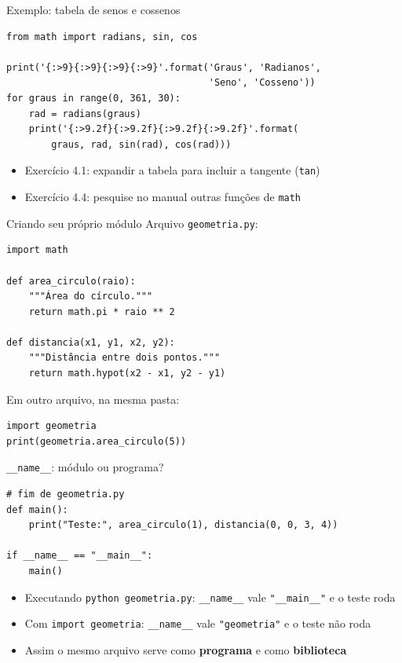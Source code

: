 \documentclass[aspectratio=169,10pt,t]{beamer}
\begin{document}
\begin{frame}[fragile]{Exemplo: tabela de senos e cossenos}
\begin{lstlisting}
from math import radians, sin, cos

print('{:>9}{:>9}{:>9}{:>9}'.format('Graus', 'Radianos',
                                    'Seno', 'Cosseno'))
for graus in range(0, 361, 30):
    rad = radians(graus)
    print('{:>9.2f}{:>9.2f}{:>9.2f}{:>9.2f}'.format(
        graus, rad, sin(rad), cos(rad)))
\end{lstlisting}
  \begin{itemize}
    \item Exercício 4.1: expandir a tabela para incluir a tangente (\texttt{tan})
    \item Exercício 4.4: pesquise no manual outras funções de \texttt{math}
  \end{itemize}
\end{frame}

\begin{frame}[fragile]{Criando seu próprio módulo}
  Arquivo \texttt{geometria.py}:
\begin{lstlisting}
import math

def area_circulo(raio):
    """Área do círculo."""
    return math.pi * raio ** 2

def distancia(x1, y1, x2, y2):
    """Distância entre dois pontos."""
    return math.hypot(x2 - x1, y2 - y1)
\end{lstlisting}
  Em outro arquivo, na mesma pasta:
\begin{lstlisting}
import geometria
print(geometria.area_circulo(5))
\end{lstlisting}
\end{frame}

\begin{frame}[fragile]{\texttt{\_\_name\_\_}: módulo ou programa?}
\begin{lstlisting}
# fim de geometria.py
def main():
    print("Teste:", area_circulo(1), distancia(0, 0, 3, 4))

if __name__ == "__main__":
    main()
\end{lstlisting}
  \begin{itemize}
    \item Executando \texttt{python geometria.py}: \texttt{\_\_name\_\_} vale \texttt{"\_\_main\_\_"} e o teste roda
    \item Com \texttt{import geometria}: \texttt{\_\_name\_\_} vale \texttt{"geometria"} e o teste \alert{não} roda
    \item Assim o mesmo arquivo serve como \textbf{programa} e como \textbf{biblioteca}
  \end{itemize}
\end{frame}
\end{document}
